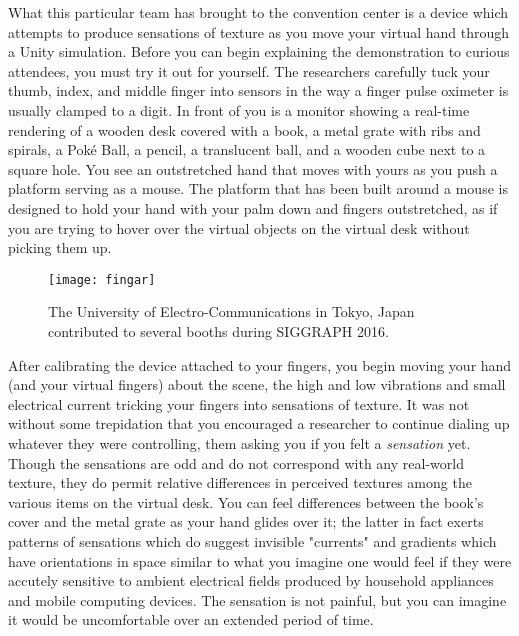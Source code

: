 \documentclass[../main.tex]{subfiles}
\begin{document}
What this particular team has brought to the convention center is a device which attempts to produce sensations of texture as you move your virtual hand through a Unity simulation. Before you can begin explaining the demonstration to curious attendees, you must try it out for yourself. The researchers carefully tuck your thumb, index, and middle finger into sensors in the way a finger pulse oximeter is usually clamped to a digit. In front of you is a monitor showing a real-time rendering of a wooden desk covered with a book, a metal grate with ribs and spirals, a Poké Ball, a pencil, a translucent ball, and a wooden cube next to a square hole. You see an outstretched hand that moves with yours as you push a platform serving as a mouse. The platform that has been built around a mouse is designed to hold your hand with your palm down and fingers outstretched, as if you are trying to hover over the virtual objects on the virtual desk without picking them up.

\begin{figure}[h!]
	\centering
	\texttt{[image: fingar]}
	\caption*{The University of Electro-Communications in Tokyo, Japan contributed to several booths during SIGGRAPH 2016.}
\end{figure}

After calibrating the device attached to your fingers, you begin moving your hand (and your virtual fingers) about the scene, the high and low vibrations and small electrical current tricking your fingers into sensations of texture. It was not without some trepidation that you encouraged a researcher to continue dialing up whatever they were controlling, them asking you if you felt a \textit{sensation} yet. Though the sensations are odd and do not correspond with any real-world texture, they do permit relative differences in perceived textures among the various items on the virtual desk. You can feel differences between the book's cover and the metal grate as your hand glides over it; the latter in fact exerts patterns of sensations which do suggest invisible "currents" and gradients which have orientations in space similar to what you imagine one would feel if they were accutely sensitive to ambient electrical fields produced by household appliances and mobile computing devices. The sensation is not painful, but you can imagine it would be uncomfortable over an extended period of time.
\end{document}
